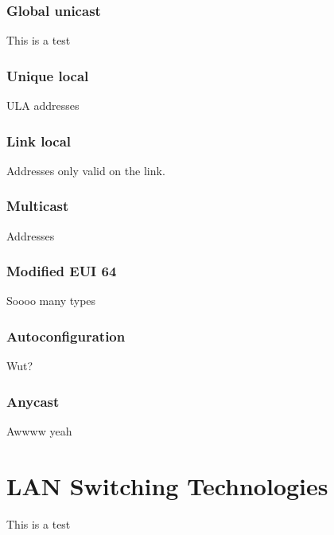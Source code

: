 \documentclass[10pt]{article}
\begin{document}
\subsubsection{Global unicast}
This is a test
\subsubsection{Unique local}
ULA addresses

\subsubsection{Link local}
Addresses only valid on the link.

\subsubsection{Multicast}
Addresses

\subsubsection{Modified EUI 64}
Soooo many types

\subsubsection{Autoconfiguration}
Wut?

\subsubsection{Anycast}
Awwww yeah

\section{LAN Switching Technologies}
This is a test

\listoftables
\end{document}
